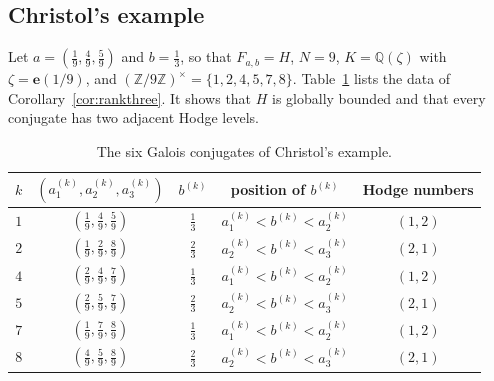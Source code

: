 \documentclass[11pt]{amsart}
\theoremstyle{definition}
\theoremstyle{remark}
\numberwithin{equation}{section}
\newcommand{\Q}{\mathbb{Q}}
\newcommand{\Z}{\mathbb{Z}}
\newcommand{\e}{\mathbf{e}}
\newcommand{\ak}[1]{a^{(k)}_{#1}}
\newcommand{\bk}{b^{(k)}}
\newcommand{\Fab}{F_{a,b}}
\begin{document}
\subsection{Christol's example}\label{subsec:H}
Let $a=(\frac19,\frac49,\frac59)$ and $b=\frac13$, so that $\Fab=H$, $N=9$, $K=\Q(\zeta)$ with $\zeta=\e(1/9)$, and $(\Z/9\Z)^\times=\{1,2,4,5,7,8\}$. Table~\ref{tab:H} lists the data of Corollary~\ref{cor:rankthree}. It shows that $H$ is globally bounded and that every conjugate has two adjacent Hodge levels.

\begin{table}[ht]
\centering
\renewcommand{\arraystretch}{1.25}
\begin{tabular}{ccccc}
\toprule
$k$ & $(\ak1,\ak2,\ak3)$ & $\bk$ & position of $\bk$ & Hodge numbers\\
\midrule
$1$ & $(\frac19,\frac49,\frac59)$ & $\frac13$ & $\ak1<\bk<\ak2$ & $(1,2)$\\
$2$ & $(\frac19,\frac29,\frac89)$ & $\frac23$ & $\ak2<\bk<\ak3$ & $(2,1)$\\
$4$ & $(\frac29,\frac49,\frac79)$ & $\frac13$ & $\ak1<\bk<\ak2$ & $(1,2)$\\
$5$ & $(\frac29,\frac59,\frac79)$ & $\frac23$ & $\ak2<\bk<\ak3$ & $(2,1)$\\
$7$ & $(\frac19,\frac79,\frac89)$ & $\frac13$ & $\ak1<\bk<\ak2$ & $(1,2)$\\
$8$ & $(\frac49,\frac59,\frac89)$ & $\frac23$ & $\ak2<\bk<\ak3$ & $(2,1)$\\
\bottomrule
\end{tabular}
\medskip
\caption{The six Galois conjugates of Christol's example.}\label{tab:H}
\end{table}
\end{document}

